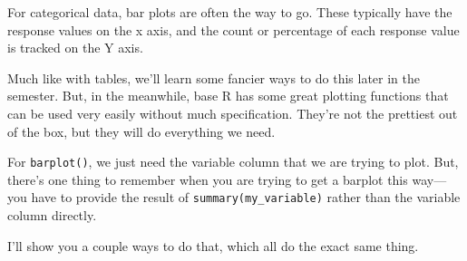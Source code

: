 \documentclass[
  letterpaper,
  DIV=11,
  numbers=noendperiod]{scrreprt}
\newenvironment{Shaded}{\begin{snugshade}}{\end{snugshade}}
\newcommand{\CommentTok}[1]{\textcolor[rgb]{0.37,0.37,0.37}{#1}}
\newcommand{\FunctionTok}[1]{\textcolor[rgb]{0.28,0.35,0.67}{#1}}
\newcommand{\NormalTok}[1]{\textcolor[rgb]{0.00,0.23,0.31}{#1}}
\newcommand{\OtherTok}[1]{\textcolor[rgb]{0.00,0.23,0.31}{#1}}
\newcommand{\SpecialCharTok}[1]{\textcolor[rgb]{0.37,0.37,0.37}{#1}}
\begin{document}
For categorical data, bar plots are often the way to go. These typically
have the response values on the x axis, and the count or percentage of
each response value is tracked on the Y axis.

Much like with tables, we'll learn some fancier ways to do this later in
the semester. But, in the meanwhile, base R has some great plotting
functions that can be used very easily without much specification.
They're not the prettiest out of the box, but they will do everything we
need.

For \texttt{barplot()}, we just need the variable column that we are
trying to plot. But, there's one thing to remember when you are trying
to get a barplot this way---you have to provide the result of
\texttt{summary(my\_variable)} rather than the variable column directly.

I'll show you a couple ways to do that, which all do the exact same
thing.

\begin{Shaded}
\end{Shaded}

\begin{Shaded}
\end{Shaded}

\begin{Shaded}
\end{Shaded}
\end{document}
